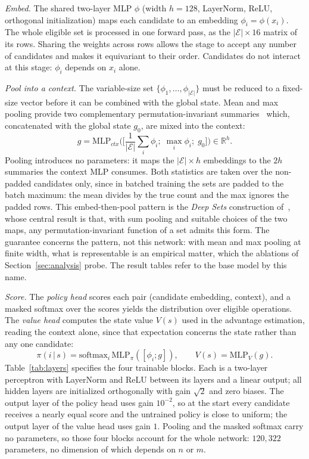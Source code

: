 \documentclass[preprint,authoryear,12pt]{elsarticle}
\theoremstyle{definition}
\theoremstyle{remark}
\begin{document}
\emph{Embed.} The shared two-layer MLP $\phi$ (width $h{=}128$,
LayerNorm, ReLU, orthogonal initialization) maps each candidate to an
embedding $\phi_i=\phi(x_i)$. The whole eligible set is processed in
one forward pass, as the $|\mathcal{E}|\times16$ matrix of its rows.
Sharing the weights across rows allows the stage to accept any number
of candidates and makes it equivariant to their order. Candidates do
not interact at this stage: $\phi_i$ depends on $x_i$ alone.

\emph{Pool into a context.} The variable-size set
$\{\phi_1,\dots,\phi_{|\mathcal{E}|}\}$ must be reduced to a
fixed-size vector before it can be combined with the global state. Mean and max
pooling provide two complementary permutation-invariant
summaries~\citep{Zaheer2017} which, concatenated with the global
state $g_0$, are mixed into the context:
\begin{equation}
g=\mathrm{MLP}_{ctx}\big(\big[\textstyle\frac1{|\mathcal{E}|}\sum_i\phi_i;\;
\max_i\phi_i;\;g_0\big]\big)\in\mathbb{R}^{h}.
\end{equation}
Pooling introduces no parameters: it maps the
$|\mathcal{E}|\times h$ embeddings to the $2h$ summaries the context
MLP consumes. Both statistics are taken over the non-padded
candidates only, since in batched training the sets are padded to the
batch maximum: the mean divides by the true count and the max ignores
the padded rows.
This embed-then-pool pattern is the \emph{Deep Sets} construction
of~\citet{Zaheer2017}, whose central result is that, with sum
pooling and suitable choices of the two maps, any permutation-invariant
function of a set admits this form. The guarantee concerns the
pattern, not this network: with mean and max pooling at finite width,
what is representable is an empirical matter, which the ablations of
Section~\ref{sec:analysis} probe. The result tables
refer to the base model by this name.

\emph{Score.} The \emph{policy head} scores each pair (candidate
embedding, context), and a masked softmax over the scores yields the
distribution over eligible operations. The \emph{value head}
computes the state value $V(s)$ used in the advantage estimation,
reading the context alone, since that expectation concerns the state
rather than any one candidate:
\begin{equation}
\pi(i\,|\,s)=\mathrm{softmax}_i\,\mathrm{MLP}_{\pi}([\phi_i;g]),
\qquad
V(s)=\mathrm{MLP}_{V}(g).
\end{equation}
Table~\ref{tab:layers} specifies the four trainable blocks. Each is a
two-layer perceptron with LayerNorm and ReLU between its layers and a
linear output; all hidden layers are initialized orthogonally with
gain $\sqrt2$ and zero biases. The output layer of the policy head
uses gain $10^{-2}$, so at the start every candidate receives a
nearly equal score and the untrained policy is close to uniform; the
output layer of the value head uses gain $1$. Pooling and the masked
softmax carry no parameters, so those four blocks account for the
whole network: $120{,}322$ parameters, no dimension of which depends
on $n$ or $m$.
\end{document}
